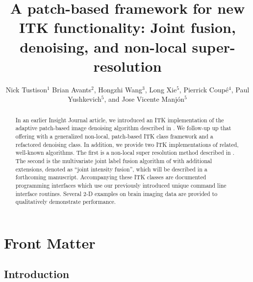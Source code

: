 \documentclass{InsightArticle}
\title{A patch-based framework for new ITK functionality:  Joint fusion, denoising,
and non-local super-resolution}
\author{Nick Tustison$^{1}$
        Brian Avants$^{2}$,
        Hongzhi Wang$^{3}$,
        Long Xie$^{5}$,
        Pierrick Coup\'e$^{4}$,
        Paul Yushkevich$^{5}$, and
        Jose Vicente Manj\'on$^{5}$}
\newcommand{\IJhandlerIDnumber}{3570}
\begin{document}
%
%
\IJhandlefooter{\IJhandlerIDnumber}




\maketitle


\ifhtml
\chapter*{Front Matter\label{front}}
\fi


\begin{abstract}
\noindent
In an earlier Insight Journal article, we introduced an ITK implementation of the
adaptive patch-based image denoising algorithm described in \cite{Manjon:2010aa}.
We follow-up up that offering with a generalized non-local, patch-based ITK class
framework and a refactored denoising class.  In addition, we provide two
ITK implementations of related, well-known algorithms.  The first is a non-local
super resolution method described in \cite{Manjon:2010ab,Manjon:2010ac}.  The second is
the multivariate
joint label fusion algorithm of \cite{Wang:2013ab,Wang:2013aa} with additional extensions,
denoted as ``joint intensity fusion'', which will be described in a forthcoming manuscript.
Accompanying these ITK classes are
documented programming interfaces which use our previously introduced unique
command line interface routines.  Several 2-D examples on brain imaging data are
provided to qualitatively demonstrate performance.
\end{abstract}

\IJhandlenote{\IJhandlerIDnumber}


\section{Introduction}
\end{document}
